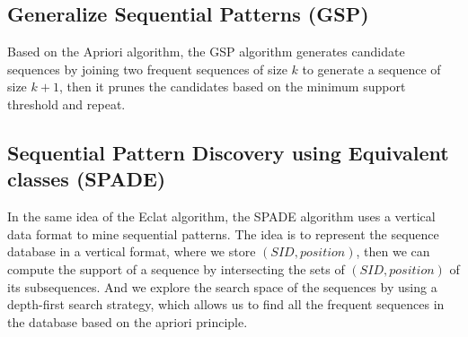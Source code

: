 \documentclass[12pt, openany]{report}
\theoremstyle{definition}
\begin{document}
\subsection{Generalize Sequential Patterns (GSP)}
Based on the Apriori algorithm, the GSP algorithm generates candidate sequences by joining two frequent sequences of size $k$ to generate a sequence of size $k + 1$, then it prunes the candidates based on the minimum support threshold and repeat.
\subsection{Sequential Pattern Discovery using Equivalent classes (SPADE)}
In the same idea of the Eclat algorithm, the SPADE algorithm uses a vertical data format to mine sequential patterns. The idea is to represent the sequence database in a vertical format, where we store $(SID, position)$, then we can compute the support of a sequence by intersecting the sets of $(SID, position)$ of its subsequences. And we explore the search space of the sequences by using a depth-first search strategy, which allows us to find all the frequent sequences in the database based on the apriori principle.
\end{document}

